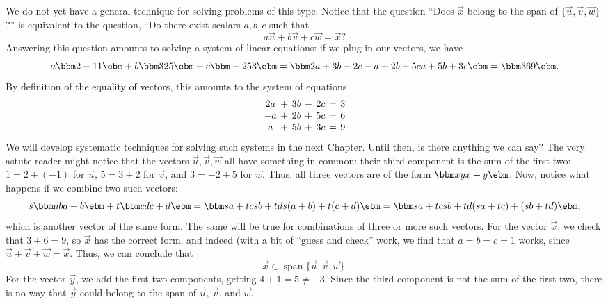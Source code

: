 {
We do not yet have a general technique for solving problems of this type. Notice that the question ``Does $\vec{x}$ belong to the span of $\{\vec{u},\vec{v},\vec{w}\}$?'' is equivalent to the question, ``Do there exist scalars $a,b,c$ such that
\[
a\vec{u}+b\vec{v}+c\vec{w}=\vec{x}?
\]
Answering this question amounts to solving a system of linear equations: if we plug in our vectors, we have
\[
a\bbm 2\\-1\\1\ebm + b\bbm 3\\2\\5\ebm + c\bbm -2\\5\\3\ebm = \bbm 2a+3b-2c\\-a+2b+5c\\a+5b+3c\ebm = \bbm 3\\6\\9\ebm.
\]
By definition of the equality of vectors, this amounts to the system of equations
\[\arraycolsep=2pt
\begin{array}{ccccccc}
2a&+&3b&-&2c&=&3\\
-a&+&2b&+&5c&=&6\\
a&+&5b&+&3c&=&9
\end{array}
\]
We will develop systematic techniques for solving such systems in the next Chapter. Until then, is there anything we can say? The very astute reader might notice that the vectors $\vec{u},\vec{v}, \vec{w}$ all have something in common: their third component is the sum of the first two: $1=2+(-1)$ for $\vec{u}$, $5=3+2$ for $\vec{v}$, and $3=-2+5$ for $\vec{w}$. Thus, all three vectors are of the form $\bbm x\\y\\x+y\ebm$. Now, notice what happens if we combine two such vectors:
\[
s\bbm a\\b\\a+b\ebm+t\bbm c\\d\\c+d\ebm = \bbm sa+tc\\sb+td\\s(a+b)+t(c+d)\ebm = \bbm sa+tc\\sb+td\\(sa+tc)+(sb+td)\ebm,
\]
which is another vector of the same form. The same will be true for combinations of three or more such vectors. For the vector $\vec{x}$, we check that $3+6=9$, so $\vec{x}$ has the correct form, and indeed (with a bit of ``guess and check'' work, we find that $a=b=c=1$ works, since $\vec{u}+\vec{v}+\vec{w}=\vec{x}$. Thus, we can conclude that
\[
\vec{x}\in\operatorname{span}\{\vec{u},\vec{v},\vec{w}\}.
\]
For the vector $\vec{y}$, we add the first two components, getting $4+1=5\neq -3$. Since the third component is not the sum of the first two, there is no way that $\vec{y}$ could belong to the span of $\vec{u}$, $\vec{v}$, and $\vec{w}$.
}

